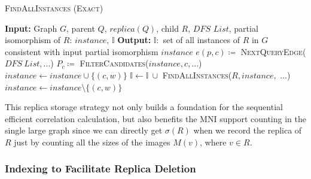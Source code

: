 \begin{algorithm}
	\dontprintsemicolon
	\caption{\textsc{FindAllInstances} \textsc{(Exact)}}\label{algo:complete-instances}
	\nonl \textbf{Input:} Graph $G$, parent $Q$, $replica(Q)$, child $R$, $DFS$ $List$, partial isomorphism of $R$: $instance$, $\mathbb{I}$\;
	\nonl \textbf{Output:} $\mathbb{I}: $ set of all instances of $R$ in $G$ consistent with input partial isomorphism $instance$\;
	{
	}
	\Else
	{
		$e(p,c) \coloneq$ \textsc{NextQueryEdge($DFS\ List, ...$)}\;
		$P_{c} \coloneq$ \textsc{FilterCandidates($instance, c, ...$)}\;
		{
			$instance \leftarrow instance \cup \{(c,w)\}$\;
			$\mathbb{I} \leftarrow \mathbb{I}\ \cup$ \textsc{FindAllInstances($R,instance,$ ...)}\;
			$instance \leftarrow instance \setminus \{(c,w)\}$\;
		}
		\;
	}
\end{algorithm}

This replica storage strategy not only builds a foundation for the sequential efficient correlation calculation, but also benefits the MNI support counting in the single large graph since we can directly get $\sigma(R)$ when we record the replica of $R$ just by counting all the sizes of the images $M(v)$, where $v\in R$.


\subsubsection{Indexing to Facilitate Replica Deletion}
\label{subsubsec:replica-indexing}

